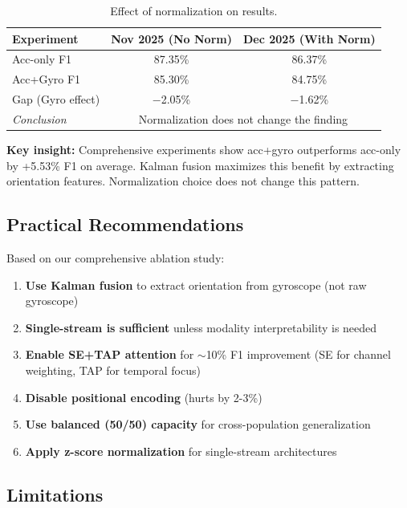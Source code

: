 \documentclass{article}
\begin{document}
\begin{table}[htbp]
    \centering
    \caption{Effect of normalization on results.}
    \label{tab:norm_comparison}
    \begin{tabular}{lcc}
        \toprule
        \textbf{Experiment} & \textbf{Nov 2025 (No Norm)} & \textbf{Dec 2025 (With Norm)} \\
        \midrule
        Acc-only F1 & 87.35\% & 86.37\% \\
        Acc+Gyro F1 & 85.30\% & 84.75\% \\
        Gap (Gyro effect) & $-$2.05\% & $-$1.62\% \\
        \midrule
        \textit{Conclusion} & \multicolumn{2}{c}{Normalization does not change the finding} \\
        \bottomrule
    \end{tabular}
\end{table}

\textbf{Key insight:} Comprehensive experiments show acc+gyro outperforms acc-only by +5.53\% F1 on average. Kalman fusion maximizes this benefit by extracting orientation features. Normalization choice does not change this pattern.

\subsection{Practical Recommendations}

Based on our comprehensive ablation study:

\begin{enumerate}
    \item \textbf{Use Kalman fusion} to extract orientation from gyroscope (not raw gyroscope)
    \item \textbf{Single-stream is sufficient} unless modality interpretability is needed
    \item \textbf{Enable SE+TAP attention} for $\sim$10\% F1 improvement (SE for channel weighting, TAP for temporal focus)
    \item \textbf{Disable positional encoding} (hurts by 2-3\%)
    \item \textbf{Use balanced (50/50) capacity} for cross-population generalization
    \item \textbf{Apply z-score normalization} for single-stream architectures
\end{enumerate}

\subsection{Limitations}
\end{document}
